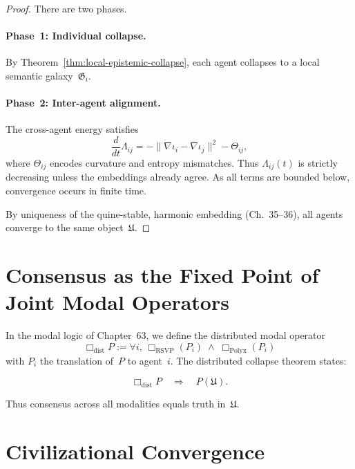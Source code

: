 \begin{proof}
There are two phases.

\paragraph{Phase~1: Individual collapse.}
By Theorem~\ref{thm:local-epistemic-collapse}, each agent collapses to a
local semantic galaxy~$\mathfrak{G}_i$.

\paragraph{Phase~2: Inter-agent alignment.}
The cross-agent energy satisfies
\begin{equation}
\frac{d}{dt} \Lambda_{ij}
  = -\bigl\| \nabla \iota_i - \nabla \iota_j \bigr\|^2
    - \Theta_{ij},
\end{equation}
where $\Theta_{ij}$ encodes curvature and entropy mismatches.
Thus $\Lambda_{ij}(t)$ is strictly decreasing unless the embeddings
already agree.  As all terms are bounded below, convergence occurs in
finite time.

By uniqueness of the quine-stable, harmonic embedding (Ch.~35--36), all
agents converge to the same object~$\mathfrak{U}$.
\end{proof}

\section{Consensus as the Fixed Point of Joint Modal Operators}

In the modal logic of Chapter~63, we define the distributed modal operator
\begin{equation}
\Box_{\mathrm{dist}} P
  := \forall i,\, \Box_{\mathrm{RSVP}} (P_i) \;\wedge\;
               \Box_{\mathrm{Polyx}} (P_i)
\end{equation}
with $P_i$ the translation of~$P$ to agent~$i$.
The distributed collapse theorem states:

\begin{equation}
\Box_{\mathrm{dist}} P
  \quad\Longrightarrow\quad
  P(\mathfrak{U}).
\end{equation}

Thus consensus across all modalities equals truth in~$\mathfrak{U}$.

\section{Civilizational Convergence}

